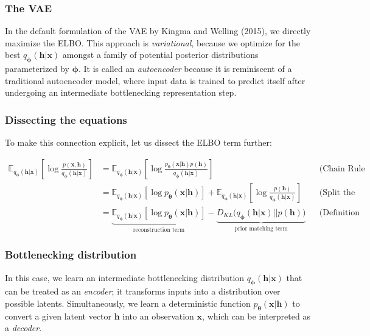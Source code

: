 \documentclass{beamer}
\begin{document}
\begin{frame}
\frametitle{The VAE}

In the default formulation of the VAE by Kingma and Welling (2015), we directly maximize the ELBO.  This
approach is \textit{variational}, because we optimize for the best
$q_{\bm{\phi}}(\bm{h}|\bm{x})$ amongst a family of potential posterior
distributions parameterized by $\bm{\phi}$.  It is called an
\textit{autoencoder} because it is reminiscent of a traditional
autoencoder model, where input data is trained to predict itself after
undergoing an intermediate bottlenecking representation step.
\end{frame}

\begin{frame}
\frametitle{Dissecting the equations}

To make
this connection explicit, let us dissect the ELBO term further:

\begin{align*}
{\mathbb{E}_{q_{\bm{\phi}}(\bm{h}|\bm{x})}\left[\log\frac{p(\bm{x}, \bm{h})}{q_{\bm{\phi}}(\bm{h}|\bm{x})}\right]}
&= {\mathbb{E}_{q_{\bm{\phi}}(\bm{h}|\bm{x})}\left[\log\frac{p_{\bm{\theta}}(\bm{x}|\bm{h})p(\bm{h})}{q_{\bm{\phi}}(\bm{h}|\bm{x})}\right]}         && {\text{(Chain Rule of Probability)}}\\
&= {\mathbb{E}_{q_{\bm{\phi}}(\bm{h}|\bm{x})}\left[\log p_{\bm{\theta}}(\bm{x}|\bm{h})\right] + \mathbb{E}_{q_{\bm{\phi}}(\bm{h}|\bm{x})}\left[\log\frac{p(\bm{h})}{q_{\bm{\phi}}(\bm{h}|\bm{x})}\right]}         && {\text{(Split the Expectation)}}\\
&= \underbrace{{\mathbb{E}_{q_{\bm{\phi}}(\bm{h}|\bm{x})}\left[\log p_{\bm{\theta}}(\bm{x}|\bm{h})\right]}}_\text{reconstruction term} - \underbrace{{D_{KL}(q_{\bm{\phi}}(\bm{h}|\bm{x})}\vert\vert{p(\bm{h}))}}_\text{prior matching term} && {\text{(Definition of KL Divergence)}}
\end{align*}
\end{frame}

\begin{frame}
\frametitle{Bottlenecking distribution}

In this case, we learn an intermediate bottlenecking distribution
$q_{\bm{\phi}}(\bm{h}|\bm{x})$ that can be treated as
an \textit{encoder}; it transforms inputs into a distribution over
possible latents.  Simultaneously, we learn a deterministic function
$p_{\bm{\theta}}(\bm{x}|\bm{h})$ to convert a given latent vector
$\bm{h}$ into an observation $\bm{x}$, which can be interpreted as
a \textit{decoder}.
\end{frame}
\end{document}
